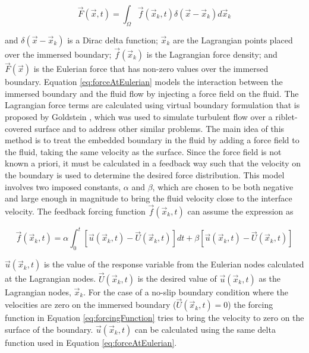 \documentclass[12pt]{aiaa-pretty}
\begin{document}
%
\begin{equation}\label{eq:forceAtEulerian}
	\vec{F}(\vec{x}, t) = \int_\Omega \vec{f} (\vec{x}_k, t) \delta(\vec{x} - \vec{x}_k) d\vec{x}_k
\end{equation}
%

and $\delta(\vec{x} - \vec{x}_k)$ is a Dirac delta function; $\vec{x}_k$ are the Lagrangian points placed over the immersed boundary; $\vec{f}(\vec{x}_k)$ is the Lagrangian force density; and $\vec{F}(\vec{x})$ is the Eulerian force that has non-zero values over the immersed boundary. Equation \eqref{eq:forceAtEulerian} models the interaction between the immersed boundary and the fluid flow by injecting a force field on the fluid. The Lagrangian force terms are calculated using virtual boundary formulation that is proposed by Goldstein \cite{goldstein1993modeling}, which was used to simulate turbulent flow over a riblet-covered surface and to address other similar problems. The main idea of this method is to treat the embedded boundary in the fluid by adding a force field to the fluid, taking the same velocity as the surface. Since the force field is not known a priori, it must be calculated in a feedback way such that the velocity on the boundary is used to determine the desired force distribution. This model involves two imposed constants, $\alpha$ and $\beta$, which are chosen to be both negative and large enough in magnitude to bring the fluid velocity close to the interface velocity. The feedback forcing function $\vec{f}(\vec{x}_k, t)$ can assume the expression as

%
\begin{equation}\label{eq:forcingFunction}
	\vec{f}\left( \vec{x}_k, t \right) = 
	\alpha \int_0^t \left[ \vec{u}\left( \vec{x}_k, t \right) - \vec{U}\left( \vec{x}_k, t \right) \right]dt + 
	\beta \left[ \vec{u}\left( \vec{x}_k, t \right) - \vec{U}\left( \vec{x}_k, t \right) \right]
\end{equation}
%

$\vec{u}\left( \vec{x}_k, t \right)$ is the value of the response variable from the Eulerian nodes calculated at the Lagrangian nodes. $\vec{U}\left( \vec{x}_k, t \right)$ is the desired value of $\vec{u}\left( \vec{x}_k, t \right)$ as the Lagrangian nodes, $\vec{x}_k$. For the case of a no-slip boundary condition where the velocities are zero on the immersed boundary ($\vec{U}\left( \vec{x}_k, t \right) = 0 $) the forcing function in Equation \eqref{eq:forcingFunction} tries to bring the velocity to zero on the surface of the boundary. $\vec{u}\left( \vec{x}_k, t \right)$ can be calculated using the same delta function used in Equation \eqref{eq:forceAtEulerian}.
\end{document}
